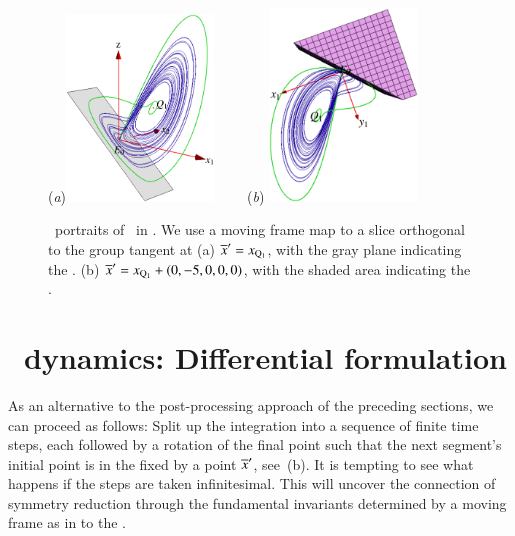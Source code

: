 \documentclass[preprint,number,sort&compress]{elsarticle}
\begin{document}
\begin{figure}[ht]
\begin{center}
  (\textit{a})\includegraphics[width=0.35\textwidth,clip=true]{CLEmfReqb123}
~~~~(\textit{b})%
\includegraphics[width=0.35\textwidth,clip=true]{CLEmfAdHoc135}
\end{center}
\caption{
\Statesp\ portraits of \cLf\ in \reducedsp. We use a
moving frame map to a slice orthogonal to the group tangent at
(a) ${\overline{x}'}  = x_{\mathrm{Q}_{1}}$, with
the gray plane indicating the \sset.
(b) ${\overline{x}'}  = x_{\mathrm{Q}_{1}}+(0,-5,0,0,0)$,
with the shaded area indicating the \sset.
    }\label{fig:CLEmfsset}
\end{figure}
%


    \PublicPrivate{}{

    } %

\section{\label{sec:MovFrameODE}\Slice\ dynamics: Differential formulation}

As an alternative to the post-processing approach of the
preceding sections, we can proceed as follows: Split up the
integration into a sequence of finite time steps, each
followed by a rotation of the final point such that the next
segment's initial point is in the {\em \slice} fixed by a
point ${\overline{x}'} $, see \,(b). It is
tempting to see what happens if the steps are taken
infinitesimal. This will uncover the connection of symmetry
reduction through the fundamental invariants determined  by a
moving frame as in  to the \emph{\mslices}.
\end{document}
